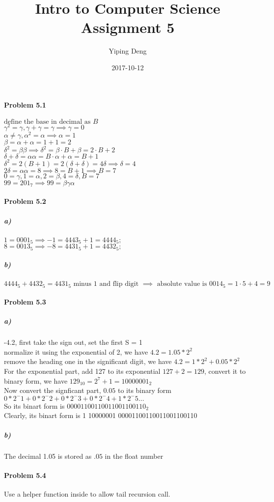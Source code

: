 \documentclass{article}
\title{Intro to Computer Science Assignment 5}
\date{2017-10-12}
\author{Yiping Deng}
\begin{document}
\maketitle
\paragraph{Problem 5.1}
$\text{define the base in decimal as } B$\\
$\gamma^2 = \gamma, \gamma + \gamma = \gamma \implies \gamma = 0$\\
$\alpha \neq \gamma, \alpha^2 = \alpha \implies \alpha = 1$\\
$\beta = \alpha + \alpha = 1 + 1 = 2$\\
$\delta^2 = \beta\beta \implies \delta^2 = \beta \cdot B + \beta = 2 \cdot B + 2$\\
$\delta + \delta = \alpha\alpha = B \cdot \alpha + \alpha = B + 1$\\
$\delta^2 = 2(B + 1) = 2(\delta + \delta) = 4\delta \implies \delta = 4$\\
$2\delta = \alpha\alpha = 8 \implies 8 = B + 1 \implies B = 7$\\
$ 0 = \gamma, 1 = \alpha, 2 = \beta, 4 = \delta, B = 7$\\
$ 99 = 201_7 \implies 99 = \beta\gamma\alpha$

\paragraph{Problem 5.2}
\subparagraph{a)}
$ 1 = 0001_5 \implies -1 = 4443_5 + 1 = 4444_5;$\\
$ 8 = 0013_5 \implies -8 = 4431_5 + 1 = 4432_5;$\\
\subparagraph{b)}
$4444_5 + 4432_5 = 4431_5 \text{ minus 1 and flip digit } \implies \text{ absolute value is } 0014_5 = 1 \cdot 5 + 4 = 9$

\paragraph{Problem 5.3}
\subparagraph{a)}
-4.2, first take the sign out, set the first S = 1\\
normalize it using the exponential of 2, we have $ 4.2 = 1.05 * 2^2$\\
remove the heading one in the significant digit, we have $ 4.2 = 1 * 2^2 + 0.05 * 2^2$ For the exponential part, add 127 to its exponential $ 127 + 2 = 129$, convert it to binary form, we have 
$129_10 = 2^7 + 1 = 10000001_2$\\
Now convert the signficant part, $0.05$ to its binary form $ 0 * 2^-1 + 0  * 2^-2 + 0 * 2^-3 + 0 * 2^-4 + 1 * 2^-5 ... $\\
So its binart form is $00001100110011001100110_2$\\
Clearly, its binart form is 1 10000001 00001100110011001100110
\subparagraph{b)}
The decimal 1.05 is stored as $.05$ in the float number

\paragraph{Problem 5.4} Use a helper function inside to allow tail recursion call.
\inputminted{haskell}{test.hs}
\end{document}
